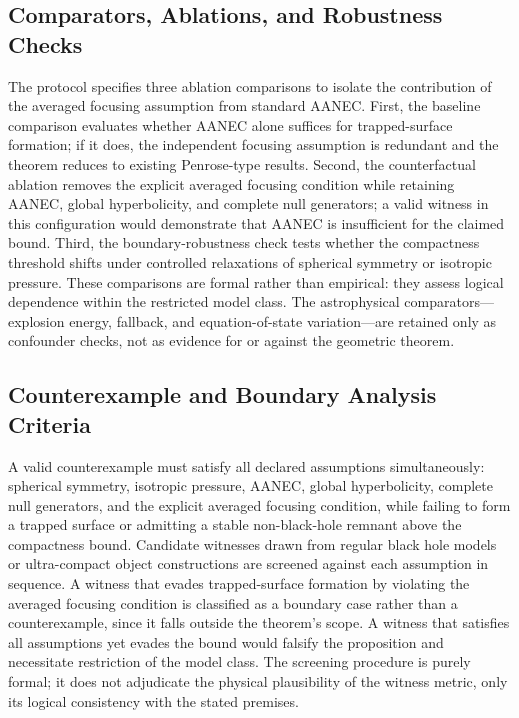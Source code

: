 \documentclass[conference]{IEEEtran}
\begin{document}
\subsection{Comparators, Ablations, and Robustness Checks}
The protocol specifies three ablation comparisons to isolate the contribution of the averaged focusing assumption from standard AANEC. First, the baseline comparison evaluates whether AANEC alone suffices for trapped-surface formation; if it does, the independent focusing assumption is redundant and the theorem reduces to existing Penrose-type results. Second, the counterfactual ablation removes the explicit averaged focusing condition while retaining AANEC, global hyperbolicity, and complete null generators; a valid witness in this configuration would demonstrate that AANEC is insufficient for the claimed bound. Third, the boundary-robustness check tests whether the compactness threshold shifts under controlled relaxations of spherical symmetry or isotropic pressure. These comparisons are formal rather than empirical: they assess logical dependence within the restricted model class. The astrophysical comparators—explosion energy, fallback, and equation-of-state variation—are retained only as confounder checks, not as evidence for or against the geometric theorem.

\subsection{Counterexample and Boundary Analysis Criteria}
A valid counterexample must satisfy all declared assumptions simultaneously: spherical symmetry, isotropic pressure, AANEC, global hyperbolicity, complete null generators, and the explicit averaged focusing condition, while failing to form a trapped surface or admitting a stable non-black-hole remnant above the compactness bound. Candidate witnesses drawn from regular black hole models or ultra-compact object constructions are screened against each assumption in sequence. A witness that evades trapped-surface formation by violating the averaged focusing condition is classified as a boundary case rather than a counterexample, since it falls outside the theorem's scope. A witness that satisfies all assumptions yet evades the bound would falsify the proposition and necessitate restriction of the model class. The screening procedure is purely formal; it does not adjudicate the physical plausibility of the witness metric, only its logical consistency with the stated premises.
\end{document}
